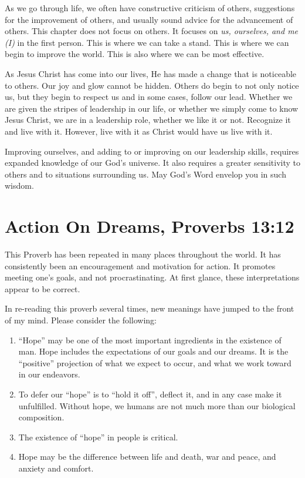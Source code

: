 \documentclass[12pt]{memoir}
\begin{document}
As we go through life, we often have constructive criticism of others, suggestions for the improvement of others, and usually sound advice for the advancement of others.
This chapter does not focus on others.
It focuses on \emph{us, ourselves, and me (I)} in the first person.
This is where we can take a stand.
This is where we can begin to improve the world.
This is also where we can be most effective.

As Jesus Christ has come into our lives, He has made a change that
is noticeable to others. Our joy and glow cannot be hidden.
Others do begin to not only notice us, but they begin to respect us
and in some cases, follow our lead.
Whether we are given the stripes of leadership in our life, or whether we simply come to know Jesus
Christ, we are in a leadership role, whether we like it or not.
Recognize it and live with it. However, live with it as Christ would
have us live with it.

Improving ourselves, and adding to or improving on our leadership
skills, requires expanded knowledge of our God's universe. It also
requires a greater sensitivity to others and to situations surrounding
us. May God's Word envelop you in such wisdom.

\section[Action On Dreams]{Action On Dreams, Proverbs 13:12}

This Proverb has been repeated in many places throughout the world.
It has consistently been an encouragement and motivation for action.
It promotes meeting one's goals, and not procrastinating. At first
glance, these interpretations appear to be correct.

In re-reading this proverb several times, new meanings have jumped
to the front of my mind. Please consider the following: 
\begin{enumerate}
\item ``Hope'' may be one of the most important ingredients in the existence
of man. Hope includes the expectations of our goals and our dreams.
It is the ``positive'' projection of what we expect to occur, and
what we work toward in our endeavors. 
\item To defer our ``hope'' is to ``hold it off'', deflect it, and in
any case make it unfulfilled. Without hope, we humans are not much
more than our biological composition. 
\item The existence of ``hope'' in people is critical. 
\item Hope may be the difference between life and death, war and peace,
and anxiety and comfort. 
\end{enumerate}
\end{document}
